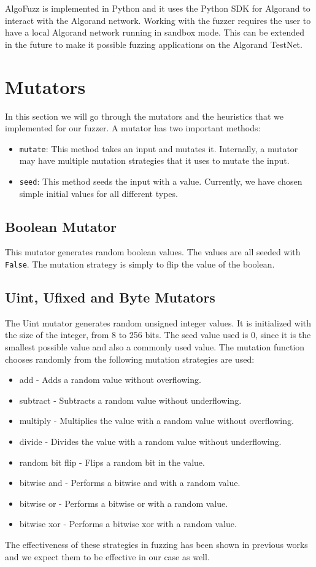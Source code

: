 AlgoFuzz is implemented in Python and it uses the Python SDK for Algorand to interact with the Algorand network.
Working with the fuzzer requires the user to have a local Algorand network running in sandbox mode.
This can be extended in the future to make it possible fuzzing applications on the Algorand TestNet.


\section{Mutators} \label{section:mutators}
In this section we will go through the mutators and the heuristics that we implemented for our fuzzer.
A mutator has two important methods:
\begin{itemize}
    \item \texttt{mutate}: This method takes an input and mutates it.
          Internally, a mutator may have multiple mutation strategies that it uses to mutate the input.
    \item \texttt{seed}: This method seeds the input with a value.
          Currently, we have chosen simple initial values for all different types.
\end{itemize}

\subsection*{Boolean Mutator}
This mutator generates random boolean values. The values are all seeded with \texttt{False}.
The mutation strategy is simply to flip the value of the boolean.

\subsection*{Uint, Ufixed and Byte Mutators}
The Uint mutator generates random unsigned integer values. It is initialized with the size of the integer, from 8 to 256 bits. The seed value used is 0, since it is the smallest possible value and also a commonly used value. The mutation function chooses randomly from the following mutation strategies are used:
\begin{itemize}
    \item add - Adds a random value without overflowing.
    \item subtract - Subtracts a random value without underflowing.
    \item multiply - Multiplies the value with a random value without overflowing.
    \item divide - Divides the value with a random value without underflowing.
    \item random bit flip - Flips a random bit in the value.
    \item bitwise and - Performs a bitwise and with a random value.
    \item bitwise or - Performs a bitwise or with a random value.
    \item bitwise xor - Performs a bitwise xor with a random value.
\end{itemize}
The effectiveness of these strategies in fuzzing has been shown in previous works and we expect them to be effective in our case as well.

